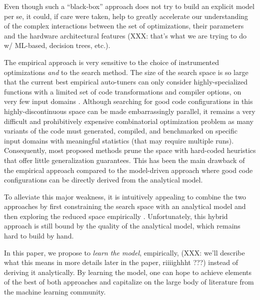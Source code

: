 \documentclass{sig-alternate}
\begin{document}
Even though such a ``black-box'' approach does not try to build an
explicit model per se, it could, if care were taken, help to greatly accelerate
our understanding of the complex interactions between the set of optimizations,
their parameters and the hardware architectural features (XXX: that's what
we are trying to do w/ ML-based, decision trees, etc.).


The empirical approach is very sensitive to the choice of instrumented
optimizations \emph{and} to the search method. The size of the search space is
so large that the current best empirical auto-tuners can only consider
highly-specialized functions with a limited set of code transformations and
compiler options, on very few input domains \citep{ganapathi2009case}. Although
searching for good code configurations in this highly-discontinuous space can
be made embarrassingly parallel, it remains a very difficult and prohibitively
expensive combinatorial optimization problem as many variants of the code must
generated, compiled, and benchmarked on specific input domains with meaningful
statistics (that may require multiple runs). Consequently, most proposed
methods prune the space with hard-coded heuristics that offer little
generalization guarantees. This has been the main drawback of the empirical
approach compared to the model-driven approach where good code configurations
can be directly derived from the analytical model.


To alleviate this major weakness, it is intuitively appealing to combine the two
approaches by first constraining the search space with an analytical model and
then exploring the reduced space empirically \citep{chen2005combining,
li2009note}. Unfortunately, this hybrid approach is still bound by the quality
of the analytical model, which remains hard to build by hand.


In this paper, we propose to \emph{learn the model}, empirically, (XXX:
we'll describe what this means in more details later in the paper, riiiighhht
???) instead of deriving it analytically. By learning the model, one can
hope to achieve elements of the best of both approaches and capitalize on the large body of
literature from the machine learning community.
\end{document}
